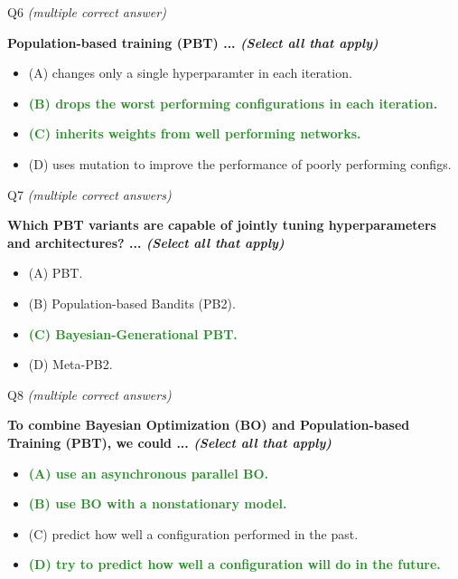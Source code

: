 \documentclass[main]{subfiles}
\newcommand{\correct}[1]{\textcolor{ForestGreen}{\textbf{#1} \checkmark}}
\newcommand{\wrong}[1]{#1}
\begin{document}
\begin{frame}{Q6 \hfill \small\normalfont\textit{(multiple correct answer)}}

\textbf{Population-based training (PBT) ... \textit{(Select all that apply)}}

\begin{itemize}
    \item \wrong{(A) \; changes only a single hyperparamter in each iteration.}
    \item \correct{(B) \; drops the worst performing configurations in each iteration.}
    \item \correct{(C) \; inherits weights from well performing networks.}
    \item \wrong{(D) \; uses mutation to improve the performance of poorly performing configs.}
\end{itemize}

\end{frame}

\begin{frame}{Q7 \hfill \small\normalfont\textit{(multiple correct answers)}}

\textbf{Which PBT variants are capable of jointly tuning hyperparameters and architectures? ... \textit{(Select all that apply)}}

\begin{itemize}
    \item \wrong{(A) \; PBT.}
    \item \wrong{(B) \; Population-based Bandits (PB2).}
    \item \correct{(C) \; Bayesian-Generational PBT.}
    \item \wrong{(D) \; Meta-PB2.}
\end{itemize}

\end{frame}

\begin{frame}{Q8 \hfill \small\normalfont\textit{(multiple correct answers)}}

\textbf{To combine Bayesian Optimization (BO) and Population-based Training (PBT), we could ... \textit{(Select all that apply)}}

\begin{itemize}
    \item \correct{(A) \; use an asynchronous parallel BO.}
    \item \correct{(B) \; use BO with a nonstationary model.}
    \item \wrong{(C) \; predict how well a configuration performed in the past.}
    \item \correct{(D) \; try to predict how well a configuration will do in the future.}
\end{itemize}

\end{frame}
\end{document}

